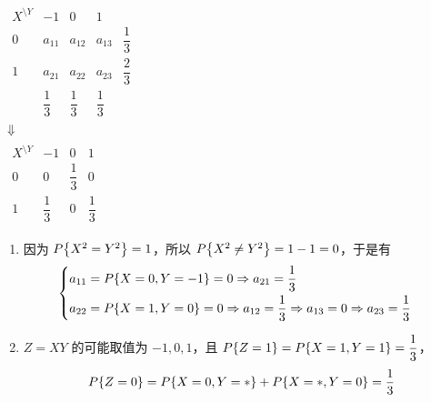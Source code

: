 \begin{solution}
    \begin{minipage}{0.28\linewidth}
        $\begin{matrix}
                \begin{array}{c|cccc}
                    X^{\displaystyle\setminus Y} & -1           & 0            & 1                           \\ \hline
                    0                            & a_{11}       & a_{12}       & a_{13}       & \dfrac{1}{3} \\[6pt]
                    1                            & a_{21}       & a_{22}       & a_{23}       & \dfrac{2}{3} \\[6pt]
                                                 & \dfrac{1}{3} & \dfrac{1}{3} & \dfrac{1}{3}
                \end{array} \\
                \Downarrow                                                                                        \\
                \begin{array}{c|cccc}
                    X^{\displaystyle\setminus Y} & -1           & 0            & 1                        \\ \hline
                    0                            & 0            & \dfrac{1}{3} & 0            & ~~~~~~~~~ \\[6pt]
                    1                            & \dfrac{1}{3} & 0            & \dfrac{1}{3}
                \end{array}
            \end{matrix}$
    \end{minipage}\hfill
    \begin{minipage}{0.68\linewidth}
        \begin{enumerate}[label=(\arabic{*})]
            \item 因为 $P\qty{X^2=Y^2}=1$，所以 $P\qty{X^2\neq Y^2}=1-1=0$，于是有
                  $$\begin{cases}
                          a_{11}=P\qty{X=0,Y=-1}=0\Rightarrow a_{21}=\dfrac{1}{3} \\[6pt]
                          a_{22}=P\qty{X=1,Y=0}=0\Rightarrow a_{12}=\dfrac{1}{3}\Rightarrow a_{13}=0\Rightarrow a_{23}=\dfrac{1}{3}
                      \end{cases}$$
            \item $Z=XY$ 的可能取值为 $-1,0,1$，且 $P\qty{Z=1}=P\qty{X=1,Y=1}=\dfrac{1}{3}$，$$P\qty{Z=0}=P\qty{X=0,Y=*}+P\qty{X=*,Y=0}=\dfrac{1}{3}$$

\end{enumerate}
\end{minipage}
\end{solution}
